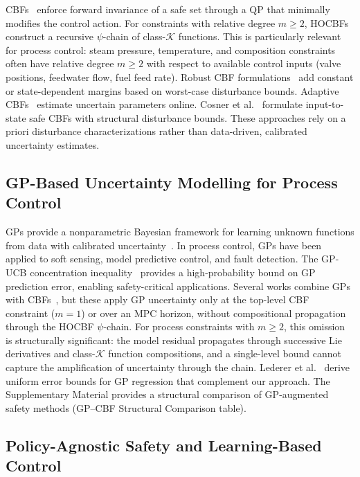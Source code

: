 CBFs~\cite{ames2017cbf,wieland2007constructive} enforce forward invariance of a safe set through a QP that minimally modifies the control action. For constraints with relative degree $m \geq 2$, HOCBFs~\cite{xiao2021hocbf} construct a recursive $\psi$-chain of class-$\mathcal{K}$ functions. This is particularly relevant for process control: steam pressure, temperature, and composition constraints often have relative degree $m \geq 2$ with respect to available control inputs (valve positions, feedwater flow, fuel feed rate). Robust CBF formulations~\cite{taylor2020issf,jankovic2018robust} add constant or state-dependent margins based on worst-case disturbance bounds. Adaptive CBFs~\cite{long2023ecbf} estimate uncertain parameters online. Cosner et al.~\cite{cosner2023robust} formulate input-to-state safe CBFs with structural disturbance bounds. These approaches rely on a priori disturbance characterizations rather than data-driven, calibrated uncertainty estimates.

\subsection{GP-Based Uncertainty Modelling for Process Control}

GPs provide a nonparametric Bayesian framework for learning unknown functions from data with calibrated uncertainty~\cite{rasmussen2006gp}. In process control, GPs have been applied to soft sensing, model predictive control, and fault detection. The GP-UCB concentration inequality~\cite{srinivas2010gp} provides a high-probability bound on GP prediction error, enabling safety-critical applications. Several works combine GPs with CBFs~\cite{cheng2019guaranteed,fisac2018general,castaneda2021pointwise}, but these apply GP uncertainty only at the top-level CBF constraint ($m=1$) or over an MPC horizon, without compositional propagation through the HOCBF $\psi$-chain. For process constraints with $m \geq 2$, this omission is structurally significant: the model residual propagates through successive Lie derivatives and class-$\mathcal{K}$ function compositions, and a single-level bound cannot capture the amplification of uncertainty through the chain. Lederer et al.~\cite{lederer2021uniform} derive uniform error bounds for GP regression that complement our approach. The Supplementary Material provides a structural comparison of GP-augmented safety methods (GP--CBF Structural Comparison table).

\subsection{Policy-Agnostic Safety and Learning-Based Control}

